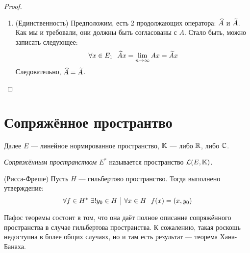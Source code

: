 \begin{proof}
\begin{enumerate}
		\item (Единственность) Предположим, есть 2 продолжающих оператора: $\widehat{A}$ и $\widetilde{A}$. Как мы и требовали, они должны быть согласованы с $A$. Стало быть, можно записать следующее:
		\[
			\forall x \in E_1\ \ \widehat{A}x = \lim_{n \to \infty} Ax = \widetilde{A}x
		\]
		Следовательно, $\widehat{A} = \widetilde{A}$.
	\end{enumerate}
\end{proof}

\section{Сопряжённое пространтво}

\begin{note}
	Далее $E$ --- линейное нормированное пространство, $\mathbb{K}$ --- либо $\mathbb{R}$, либо $\mathbb{C}$.
\end{note}

\begin{definition}
	\textit{Сопряжённым пространством} $E^*$ называется пространство $\mathcal{L}(E, \mathbb{K})$.
\end{definition}

\begin{theorem} (Рисса-Фреше)
	Пусть $H$ --- гильбертово пространство. Тогда выполнено утверждение:
	\[
		\forall f \in H^*\ \exists! y_0 \in H \ \big|\  \forall x \in H\ \ f(x) = (x, y_0)
	\]
\end{theorem}

\begin{note}
	Пафос теоремы состоит в том, что она даёт полное описание сопряжённого пространства в случае гильбертова пространства. К сожалению, такая роскошь недоступна в более общих случаях, но и там есть результат --- теорема Хана-Банаха.
\end{note}

